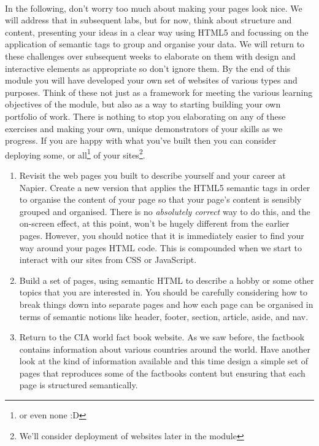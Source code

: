 \documentclass[10pt, a4paper, twosize]{article}
\begin{document}
\paragraph{} In the following, don't worry too much about making your pages look nice. We will address that in subsequent labs, but for now, think about structure and content, presenting your ideas in a clear way using HTML5 and focussing on the application of semantic tags to group and organise your data. We will return to these challenges over subsequent weeks to elaborate on them with design and interactive elements as appropriate so don't ignore them. By the end of this module you will have developed your own set of websites of various types and purposes. Think of these not just as a framework for meeting the various learning objectives of the module, but also as a way to starting building your own portfolio of work. There is nothing to stop you elaborating on any of these exercises and making your own, unique demonstrators of your skills as we progress. If you are happy with what you've built then you can consider deploying some, or all\footnote{or even none :D} of your sites\footnote{We'll consider deployment of websites later in the module}.
\begin{enumerate}
\item Revisit the web pages you built to describe yourself and your career at Napier. Create a new version that applies the HTML5 semantic tags in order to organise the content of your page so that your page's content is sensibly grouped and organised. There is no \emph{absolutely correct} way to do this, and the on-screen effect, at this point, won't be hugely different from the earlier pages. However, you should notice that it is immediately easier to find your way around your pages HTML code. This is compounded when we start to interact with our sites from CSS or JavaScript.

\item Build a set of pages, using semantic HTML to describe a hobby or some other topics that you are interested in. You should be carefully considering how to break things down into separate pages and how each page can be organised in terms of semantic notions like header, footer, section, article, aside, and nav. 

\item Return to the CIA world fact book website. As we saw before, the factbook contains information about various countries around the world. Have another look at the kind of information available and this time design a simple set of pages that reproduces some of the factbooks content but ensuring that each page is structured semantically.

\end{enumerate}
\end{document}

